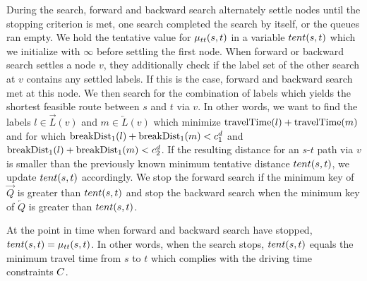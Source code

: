 During the search, forward and backward search alternately settle nodes until the stopping criterion is met, one search completed the search by itself, or the queues ran empty. We hold the tentative value for $\mu_{tt}(s,t)$ in a variable $tent(s,t)$ which we initialize with $\infty$ before settling the first node. When forward or backward search settles a node $v$, they additionally check if the label set of the other search at $v$ contains any settled labels. If this is the case, forward and backward search met at this node. We then search for the combination of labels which yields the shortest feasible route between $s$ and $t$ via $v$. In other words, we want to find the labels $l \in \overrightarrow{L}(v)$ and $m \in \overleftarrow{L}(v)$ which minimize $\operatorname{travelTime}(l) + \operatorname{travelTime}(m)$ and for which $\operatorname{breakDist}_1(l) + \operatorname{breakDist}_1(m) < c_1^d$ and $\operatorname{breakDist}_1(l) + \operatorname{breakDist}_1(m) < c_2^d$. If the resulting distance for an $s$-$t$ path via $v$ is smaller than the previously known minimum tentative distance $tent(s,t)$, we update $tent(s,t)$ accordingly. We stop the forward search if the minimum key of $\overrightarrow{Q}$ is greater than $tent(s,t)$ and stop the backward search when the minimum key of $\overleftarrow{Q}$ is greater than $tent(s,t)$.

\begin{theorem}
	At the point in time when forward and backward search have stopped, $tent(s,t) = \mu_{tt}(s,t)$. In other words, when the search stops, $tent(s,t)$ equals the minimum travel time from $s$ to $t$ which complies with the driving time constraints $C$.
\end{theorem}

